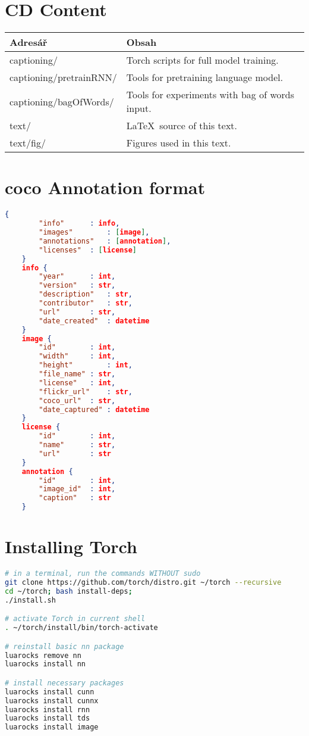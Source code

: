 \chapter{CD Content}

\begin{table}[h]
	\centering
	\renewcommand{\arraystretch}{1.2}
	\begin{tabular}{|l|l|}
		\hline
		Adresář & Obsah  \\
		\hline
		\hline
		captioning/ & Torch scripts for full model training. \\
		captioning/pretrainRNN/ & Tools for pretraining language model. \\
		captioning/bagOfWords/ & Tools for experiments with bag of words input. \\
		text/ & \LaTeX\ source of this text. \\
		text/fig/ & Figures used in this text. \\
		\hline
	\end{tabular}
	\label{tab:cdcontent}
\end{table}

\chapter{\gls{coco} Annotation format} \label{chp:jsonAnnotation}
\begin{lstlisting}[language=json,firstnumber=1]
	{
		"info"		: info,
		"images"		: [image],
		"annotations"	: [annotation],
		"licenses"	: [license]
	}
	info {
		"year"		: int,
		"version"	: str,
		"description"	: str,
		"contributor"	: str,
		"url"		: str,
		"date_created"	: datetime
	}
	image {
		"id"		: int,
		"width"		: int,
		"height"		: int,
		"file_name"	: str,
		"license"	: int,
		"flickr_url"	: str,
		"coco_url"	: str,
		"date_captured"	: datetime
	}
	license {
		"id"		: int,
		"name"		: str,
		"url"		: str
	}
	annotation {
		"id"		: int,
		"image_id"	: int,
		"caption"	: str
	}
\end{lstlisting}

\chapter{Installing Torch}\label{chp:installation}

\begin{lstlisting}[firstnumber=1,breakindent=75pt, language=bash,frame=single]
# in a terminal, run the commands WITHOUT sudo
git clone https://github.com/torch/distro.git ~/torch --recursive
cd ~/torch; bash install-deps;
./install.sh

# activate Torch in current shell
. ~/torch/install/bin/torch-activate

# reinstall basic nn package
luarocks remove nn
luarocks install nn

# install necessary packages
luarocks install cunn
luarocks install cunnx
luarocks install rnn
luarocks install tds
luarocks install image

\end{lstlisting}


